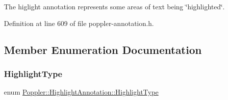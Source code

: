 The higlight annotation represents some areas of text being \char`\"{}highlighted\char`\"{}. 

Definition at line 609 of file poppler-\/annotation.\+h.



\subsection{Member Enumeration Documentation}
\mbox{\label{class_poppler_1_1_highlight_annotation_ae605e74038eb2a3810a789377524f2a0}} 
\subsubsection{\texorpdfstring{Highlight\+Type}{HighlightType}}
{\footnotesize\ttfamily enum \hyperlink{class_poppler_1_1_highlight_annotation_ae605e74038eb2a3810a789377524f2a0}{Poppler\+::\+Highlight\+Annotation\+::\+Highlight\+Type}}

